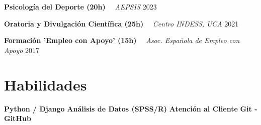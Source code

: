 \documentclass[letterpaper,11pt]{article}
\begin{document}
    \par 
    \vspace{0.1cm} 
    \noindent
    \begin{minipage}[t]{1.0\linewidth}
        {\textbf{Psicología del Deporte (20h)}} 
        \ \textendash \ 
        {\color{detailgray}\textit{AEPSIS}}
        \hfill 
        {\small 2023}
    \end{minipage}
    \par 
    \vspace{0.1cm} 
    \noindent
    \begin{minipage}[t]{1.0\linewidth}
        {\textbf{Oratoria y Divulgación Científica (25h)}} 
        \ \textendash \ 
        {\color{detailgray}\textit{Centro INDESS, UCA}}
        \hfill 
        {\small 2021}
    \end{minipage}
    \par 
    \vspace{0.1cm} 
    \noindent
    \begin{minipage}[t]{1.0\linewidth}
        {\textbf{Formación 'Empleo con Apoyo' (15h)}} 
        \ \textendash \ 
        {\color{detailgray}\textit{Asoc. Española de Empleo con Apoyo}}
        \hfill 
        {\small 2017}
    \end{minipage}
    \par 
    \vspace{0.1cm} 

\section{Habilidades}
\noindent
    \textbf{Python / Django} 
     \quad \textbullet \quad     \textbf{Análisis de Datos (SPSS/R)} 
     \quad \textbullet \quad     \textbf{Atención al Cliente} 
     \quad \textbullet \quad     \textbf{Git - GitHub} 
    
\end{document}

